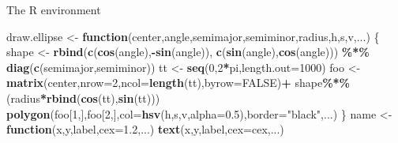\documentclass[
  ignorenonframetext,
]{beamer}
\newenvironment{Shaded}{\begin{snugshade}}{\end{snugshade}}
\newcommand{\ControlFlowTok}[1]{\textcolor[rgb]{0.13,0.29,0.53}{\textbf{#1}}}
\newcommand{\DataTypeTok}[1]{\textcolor[rgb]{0.13,0.29,0.53}{#1}}
\newcommand{\DecValTok}[1]{\textcolor[rgb]{0.00,0.00,0.81}{#1}}
\newcommand{\FloatTok}[1]{\textcolor[rgb]{0.00,0.00,0.81}{#1}}
\newcommand{\KeywordTok}[1]{\textcolor[rgb]{0.13,0.29,0.53}{\textbf{#1}}}
\newcommand{\NormalTok}[1]{#1}
\newcommand{\OperatorTok}[1]{\textcolor[rgb]{0.81,0.36,0.00}{\textbf{#1}}}
\newcommand{\OtherTok}[1]{\textcolor[rgb]{0.56,0.35,0.01}{#1}}
\newcommand{\StringTok}[1]{\textcolor[rgb]{0.31,0.60,0.02}{#1}}
\begin{document}
\begin{frame}[fragile]{The R environment}
\begin{Shaded}
\begin{Highlighting}[]
\NormalTok{draw.ellipse \textless{}{-}}\StringTok{ }\ControlFlowTok{function}\NormalTok{(center,angle,semimajor,semiminor,radius,h,s,v,...) \{}
\NormalTok{    shape \textless{}{-}}\StringTok{ }\KeywordTok{rbind}\NormalTok{(}\KeywordTok{c}\NormalTok{(}\KeywordTok{cos}\NormalTok{(angle),}\OperatorTok{{-}}\KeywordTok{sin}\NormalTok{(angle)),}
                   \KeywordTok{c}\NormalTok{(}\KeywordTok{sin}\NormalTok{(angle),}\KeywordTok{cos}\NormalTok{(angle))) }\OperatorTok{\%*\%}\StringTok{ }\KeywordTok{diag}\NormalTok{(}\KeywordTok{c}\NormalTok{(semimajor,semiminor))}
\NormalTok{    tt \textless{}{-}}\StringTok{ }\KeywordTok{seq}\NormalTok{(}\DecValTok{0}\NormalTok{,}\DecValTok{2}\OperatorTok{*}\NormalTok{pi,}\DataTypeTok{length.out=}\DecValTok{1000}\NormalTok{)}
\NormalTok{    foo \textless{}{-}}\StringTok{ }\KeywordTok{matrix}\NormalTok{(center,}\DataTypeTok{nrow=}\DecValTok{2}\NormalTok{,}\DataTypeTok{ncol=}\KeywordTok{length}\NormalTok{(tt),}\DataTypeTok{byrow=}\OtherTok{FALSE}\NormalTok{)}\OperatorTok{+}
\StringTok{      }\NormalTok{shape}\OperatorTok{\%*\%}\NormalTok{(radius}\OperatorTok{*}\KeywordTok{rbind}\NormalTok{(}\KeywordTok{cos}\NormalTok{(tt),}\KeywordTok{sin}\NormalTok{(tt)))}
    \KeywordTok{polygon}\NormalTok{(foo[}\DecValTok{1}\NormalTok{,],foo[}\DecValTok{2}\NormalTok{,],}\DataTypeTok{col=}\KeywordTok{hsv}\NormalTok{(h,s,v,}\DataTypeTok{alpha=}\FloatTok{0.5}\NormalTok{),}\DataTypeTok{border=}\StringTok{"black"}\NormalTok{,...)}
\NormalTok{\}}
\NormalTok{name \textless{}{-}}\StringTok{ }\ControlFlowTok{function}\NormalTok{(x,y,label,}\DataTypeTok{cex=}\FloatTok{1.2}\NormalTok{,...) }\KeywordTok{text}\NormalTok{(x,y,label,}\DataTypeTok{cex=}\NormalTok{cex,...)}


\end{Highlighting}
\end{Shaded}
\end{frame}
\end{document}
